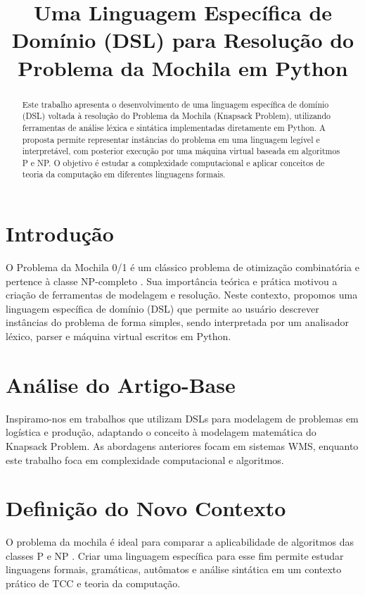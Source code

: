 \documentclass[conference]{IEEEtran}
\title{Uma Linguagem Específica de Domínio (DSL) para Resolução do Problema da Mochila em Python}
\author{
    \IEEEauthorblockN{Guilherme Cavenaghi - 109317,
    Rafael Godoy - 110453,
    Rafael Pereira de Souza - 109680}
    \IEEEauthorblockA{Centro Universitário FHO\\
    \{guilherme.cavenaghi, rafagodoy330, r.souza\}@alunos.fho.edu.br}
}
\begin{document}
\maketitle

\begin{abstract}
Este trabalho apresenta o desenvolvimento de uma linguagem específica de domínio (DSL) voltada à resolução do Problema da Mochila (Knapsack Problem), utilizando ferramentas de análise léxica e sintática implementadas diretamente em Python. A proposta permite representar instâncias do problema em uma linguagem legível e interpretável, com posterior execução por uma máquina virtual baseada em algoritmos P e NP. O objetivo é estudar a complexidade computacional e aplicar conceitos de teoria da computação em diferentes linguagens formais.
\end{abstract}

\section{Introdução}
O Problema da Mochila 0/1 é um clássico problema de otimização combinatória e pertence à classe NP-completo \cite{martello1990knapsack}. Sua importância teórica e prática motivou a criação de ferramentas de modelagem e resolução. Neste contexto, propomos uma linguagem específica de domínio (DSL) que permite ao usuário descrever instâncias do problema de forma simples, sendo interpretada por um analisador léxico, parser e máquina virtual escritos em Python.

\section{Análise do Artigo-Base}
Inspiramo-nos em trabalhos que utilizam DSLs para modelagem de problemas em logística e produção, adaptando o conceito à modelagem matemática do Knapsack Problem. As abordagens anteriores focam em sistemas WMS, enquanto este trabalho foca em complexidade computacional e algoritmos.

\section{Definição do Novo Contexto}
O problema da mochila é ideal para comparar a aplicabilidade de algoritmos das classes P e NP \cite{cormen2022algorithms}. Criar uma linguagem específica para esse fim permite estudar linguagens formais, gramáticas, autômatos e análise sintática em um contexto prático de TCC e teoria da computação.
\end{document}
